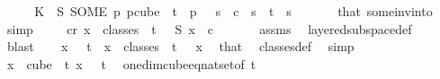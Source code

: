 \begin{isabellebody}
\ \ \isamarkupfalse%
\ \isamarkupfalse%
\ K{}{\isacharcolon}{\kern0pt}\ {\isachardoublequoteopen}{\isasymchi}\ {\isacharparenleft}{\kern0pt}S\ {\isacharparenleft}{\kern0pt}SOME\ p{\isachardot}{\kern0pt}\ p{\isasymin}cube\ {}\ {\isacharparenleft}{\kern0pt}t{\isacharplus}{\kern0pt}{}{\isacharparenright}{\kern0pt}\ {\isasymand}\ p\ {}\ {\isacharequal}{\kern0pt}\ s{\isacharparenright}{\kern0pt}{\isacharparenright}{\kern0pt}\ {\isacharequal}{\kern0pt}\ c{}{\isachardoublequoteclose}\ \ {\isachardoublequoteopen}s\ {\isacharless}{\kern0pt}\ t{\isachardoublequoteclose}\ \ s\ \isanewline
\ \ \ \ \isamarkupfalse%
\ that\ some{\isacharunderscore}{\kern0pt}inv{\isacharunderscore}{\kern0pt}into{\isacharunderscore}{\kern0pt}{}\ \isamarkupfalse%
\ simp\isanewline
\isanewline
\ \ \isamarkupfalse%
\ {\isacharasterisk}{\kern0pt}{\isacharcolon}{\kern0pt}\ {\isachardoublequoteopen}{\isasymexists}c{\isacharless}{\kern0pt}r{\isachardot}{\kern0pt}\ {\isasymforall}x\ {\isasymin}\ classes\ {}\ t\ {}{\isachardot}{\kern0pt}\ {\isasymchi}\ {\isacharparenleft}{\kern0pt}S\ x{\isacharparenright}{\kern0pt}\ {\isacharequal}{\kern0pt}\ c{\isachardoublequoteclose}\ \isanewline
\ \ \ \ \isamarkupfalse%
\ assms{\isacharparenleft}{\kern0pt}{}{\isacharparenright}{\kern0pt}\ \isamarkupfalse%
\ layered{\isacharunderscore}{\kern0pt}subspace{\isacharunderscore}{\kern0pt}def\ \isamarkupfalse%
\ blast\isanewline
\isanewline
\ \ \isamarkupfalse%
\ {\isachardoublequoteopen}x\ {}\ {\isacharequal}{\kern0pt}\ t{\isachardoublequoteclose}\ \ {\isachardoublequoteopen}x\ {\isasymin}\ classes\ {}\ t\ {}{\isachardoublequoteclose}\ \ x\ \isamarkupfalse%
\ that\ \isamarkupfalse%
\ classes{\isacharunderscore}{\kern0pt}def\ \isamarkupfalse%
\ simp\isanewline
\ \ \isamarkupfalse%
\ \isamarkupfalse%
\ {\isachardoublequoteopen}{\isasymexists}{\isacharbang}{\kern0pt}x\ {\isasymin}\ cube\ {}\ {\isacharparenleft}{\kern0pt}t{\isacharplus}{\kern0pt}{}{\isacharparenright}{\kern0pt}{\isachardot}{\kern0pt}\ x\ {}\ {\isacharequal}{\kern0pt}\ t{\isachardoublequoteclose}\ \isamarkupfalse%
\ one{\isacharunderscore}{\kern0pt}dim{\isacharunderscore}{\kern0pt}cube{\isacharunderscore}{\kern0pt}eq{\isacharunderscore}{\kern0pt}nat{\isacharunderscore}{\kern0pt}set{\isacharbrackleft}{\kern0pt}of\ {\isachardoublequoteopen}t{\isacharplus}{\kern0pt}{}{\isachardoublequoteclose}{\isacharbrackright}{\kern0pt}\ \isanewline

\end{isabellebody}
